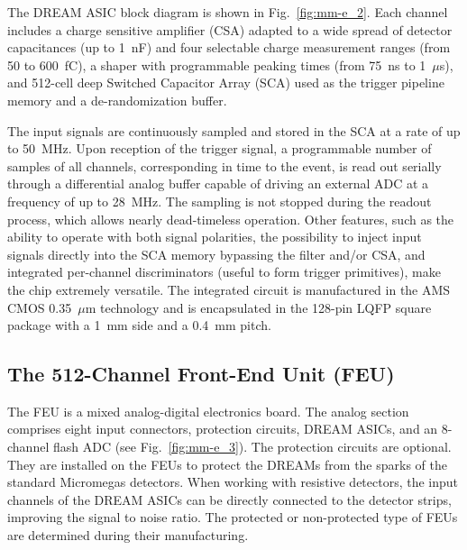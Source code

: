 The DREAM ASIC block diagram is shown in Fig.~\ref{fig:mm-e_2}. Each channel includes a charge sensitive amplifier 
(CSA) adapted to a wide spread of detector capacitances (up to 1~nF) and
four selectable charge measurement ranges (from 50 to 600~fC), a shaper with programmable peaking times (from 75~ns to
1~$\mu$s), and 512-cell deep Switched Capacitor Array (SCA) used as the trigger pipeline memory and a de-randomization buffer.

The input signals are continuously sampled and stored in the SCA at a rate of up to 50~MHz. Upon reception of the trigger signal,
a programmable number of samples of all channels, corresponding in time to the event, is read out serially through a differential
analog buffer capable of driving an external ADC at a frequency of up to 28~MHz. The sampling is not stopped during the readout
process, which allows nearly dead-timeless operation. Other features, such as the ability to operate with both signal polarities,
the possibility to inject input signals directly into the SCA memory bypassing the filter and/or CSA, and integrated per-channel
discriminators (useful to form trigger primitives), make the chip extremely versatile. The integrated circuit is manufactured in
the AMS CMOS 0.35~$\mu$m technology and is encapsulated in the 128-pin LQFP square package with a 1~mm side and a
0.4~mm pitch.

\subsection{The 512-Channel Front-End Unit (FEU)}

The FEU is a mixed analog-digital electronics board. The analog section comprises eight input connectors, protection circuits,
DREAM ASICs, and an 8-channel flash ADC (see Fig.~\ref{fig:mm-e_3}). The protection circuits are optional.  They are installed
on the FEUs to protect the DREAMs from the sparks of the standard Micromegas detectors. When working with resistive
detectors, the input channels of the DREAM ASICs can be directly connected to the detector strips, improving the signal to
noise ratio. The protected or non-protected type of FEUs are determined during their manufacturing.

